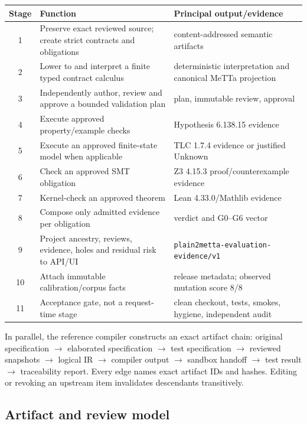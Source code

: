 \documentclass[11pt]{article}
\newcommand{\code}[1]{\texttt{#1}}
\begin{document}
\begin{center}
\small
\begin{tabularx}{0.97\textwidth}{@{}cXl@{}}
\toprule
Stage & Function & Principal output/evidence \\
\midrule
1 & Preserve exact reviewed source; create strict contracts and obligations & content-addressed semantic artifacts \\
2 & Lower to and interpret a finite typed contract calculus & deterministic interpretation and canonical MeTTa projection \\
3 & Independently author, review and approve a bounded validation plan & plan, immutable review, approval \\
4 & Execute approved property/example checks & Hypothesis 6.138.15 evidence \\
5 & Execute an approved finite-state model when applicable & TLC 1.7.4 evidence or justified Unknown \\
6 & Check an approved SMT obligation & Z3 4.15.3 proof/counterexample evidence \\
7 & Kernel-check an approved theorem & Lean 4.33.0/Mathlib evidence \\
8 & Compose only admitted evidence per obligation & verdict and G0--G6 vector \\
9 & Project ancestry, reviews, evidence, holes and residual risk to API/UI & \code{plain2metta-evaluation-evidence/v1} \\
10 & Attach immutable calibration/corpus facts & release metadata; observed mutation score 8/8 \\
11 & Acceptance gate, not a request-time stage & clean checkout, tests, smokes, hygiene, independent audit \\
\bottomrule
\end{tabularx}
\end{center}

In parallel, the reference compiler constructs an exact artifact chain:
original specification $\rightarrow$ elaborated specification $\rightarrow$
test specification $\rightarrow$ reviewed snapshots $\rightarrow$ logical IR
$\rightarrow$ compiler output $\rightarrow$ sandbox handoff $\rightarrow$
test result $\rightarrow$ traceability report.  Every edge names exact artifact
IDs and hashes.  Editing or revoking an upstream item invalidates descendants
transitively.

\subsection{Artifact and review model}
\end{document}
